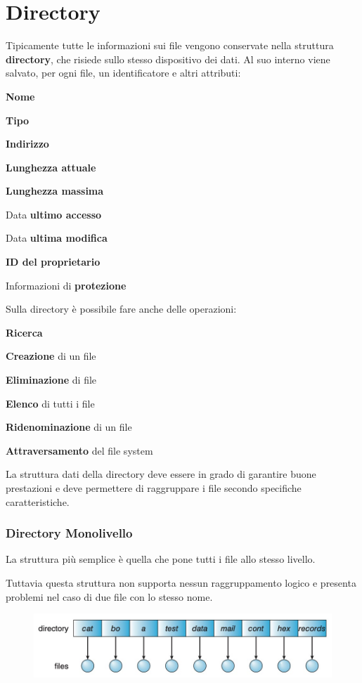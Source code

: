 \section{Directory}
Tipicamente tutte le informazioni sui file vengono conservate nella struttura \textbf{directory}, che risiede sullo stesso dispositivo dei dati.
Al suo interno viene salvato, per ogni file, un identificatore e altri attributi:
\begin{sitemize}
    \item \textbf{Nome}
    \item \textbf{Tipo}
    \item \textbf{Indirizzo}
    \item \textbf{Lunghezza attuale}
    \item \textbf{Lunghezza massima}
    \item Data \textbf{ultimo accesso}
    \item Data \textbf{ultima modifica}
    \item \textbf{ID del proprietario}
    \item Informazioni di \textbf{protezione}
\end{sitemize}

\spacer
Sulla directory è possibile fare anche delle operazioni:
\begin{sitemize}
    \item \textbf{Ricerca}
    \item \textbf{Creazione} di un file
    \item \textbf{Eliminazione} di file
    \item \textbf{Elenco} di tutti i file
    \item \textbf{Ridenominazione} di un file
    \item \textbf{Attraversamento} del file system
\end{sitemize}

\spacer
La struttura dati della directory deve essere in grado di garantire buone prestazioni e deve permettere di raggruppare i file secondo specifiche caratteristiche.

\subsubsection*{Directory Monolivello}
La struttura più semplice è quella che pone tutti i file allo stesso livello.

Tuttavia questa struttura non supporta nessun raggruppamento logico e presenta problemi nel caso di due file con lo stesso nome.
\begin{figure}[H]
    \centering
    \includegraphics[width=0.5\linewidth]{assets/directory-monolivello.jpg}
\end{figure}

